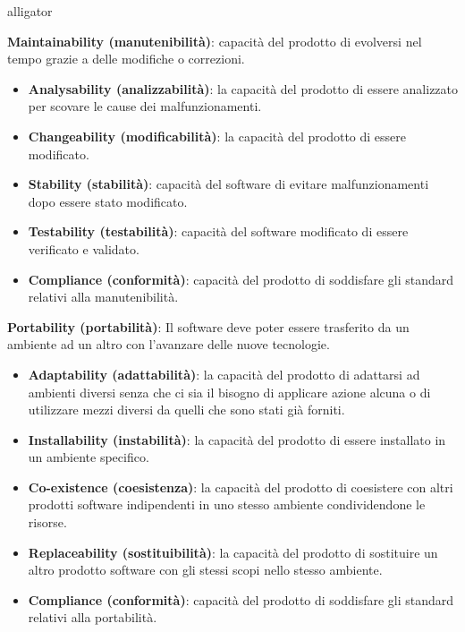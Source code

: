 \begin{labeling}{alligator}
	\item \textbf{Maintainability (manutenibilità)}: capacità del prodotto di evolversi nel tempo grazie a delle modifiche o correzioni.
	\begin{itemize}
		\item \textbf{Analysability (analizzabilità)}: la capacità del prodotto di essere analizzato per scovare le cause dei malfunzionamenti.
		
		\item \textbf{Changeability (modificabilità)}: la capacità del prodotto di essere modificato.
		
		\item \textbf{Stability (stabilità)}: capacità del software di evitare malfunzionamenti dopo essere stato modificato.
		
		\item \textbf{Testability (testabilità)}: capacità del software modificato di essere verificato e validato.
		
		\item \textbf{Compliance (conformità)}: capacità del prodotto di soddisfare gli standard relativi alla manutenibilità.
	\end{itemize}
	
	\item \textbf{Portability (portabilità)}: Il software deve poter essere trasferito da un ambiente ad un altro con l'avanzare delle nuove tecnologie.
	\begin{itemize}
		\item \textbf{Adaptability (adattabilità)}: la capacità del prodotto di adattarsi ad ambienti diversi senza che ci sia il bisogno di applicare azione alcuna o di utilizzare mezzi diversi da quelli che sono stati già forniti. 
		
		\item \textbf{Installability (instabilità)}: la capacità del prodotto di essere installato in un ambiente specifico.
		
		\item \textbf{Co-existence (coesistenza)}: la capacità del prodotto di coesistere con altri prodotti software indipendenti in uno stesso ambiente condividendone le risorse.
		
		\item \textbf{Replaceability (sostituibilità)}: la capacità del prodotto di sostituire un altro prodotto software con gli stessi scopi nello stesso ambiente. 
		
		\item \textbf{Compliance (conformità)}: capacità del prodotto di soddisfare gli standard relativi alla portabilità.
	\end{itemize}
\end{labeling}

